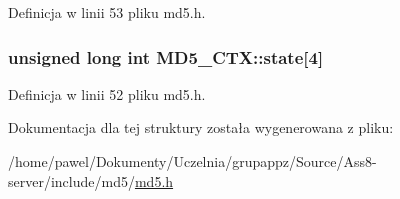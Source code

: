 Definicja w linii 53 pliku md5.h.\hypertarget{a00003_2f697997f51de65d08227fdf1d5c44b8}{
\subsubsection[{state}]{\setlength{\rightskip}{0pt plus 5cm}unsigned long int {\bf MD5\_\-CTX::state}\mbox{[}4\mbox{]}}}
\label{d1/d7c/a00003_2f697997f51de65d08227fdf1d5c44b8}




Definicja w linii 52 pliku md5.h.

Dokumentacja dla tej struktury została wygenerowana z pliku:\begin{CompactItemize}
\item 
/home/pawel/Dokumenty/Uczelnia/grupappz/Source/Ass8-server/include/md5/\hyperlink{a00010}{md5.h}\end{CompactItemize}
